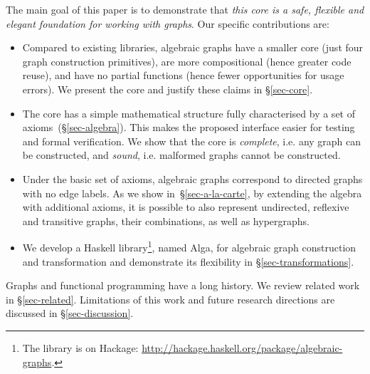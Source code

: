 The main goal of this paper is to demonstrate that \emph{this core is a safe, flexible
and elegant foundation for working with graphs}. Our specific contributions are:
\begin{itemize}
  \item Compared to existing libraries, algebraic graphs have a smaller
  core (just four graph construction primitives), are more compositional
  (hence greater code reuse), and have no partial functions (hence fewer
  opportunities for usage errors). We present the core and justify these claims
  in \S\ref{sec-core}.

  \item The core has a simple mathematical structure fully characterised
  by a set of axioms~(\S\ref{sec-algebra}). This makes the
  proposed interface easier for testing and formal verification. We show that
  the core is \emph{complete}, i.e. any graph can be constructed, and \emph{sound},
  i.e. malformed graphs cannot be constructed.

  \item Under the basic set of axioms, algebraic graphs correspond to directed
  graphs with no edge labels. As we show in~\S\ref{sec-a-la-carte}, by extending
  the algebra
  with additional axioms, it is possible to also represent undirected, reflexive
  and transitive graphs, their combinations, as well as hypergraphs.

  \item We develop a Haskell library\footnote{The library is on Hackage:
  \url{http://hackage.haskell.org/package/algebraic-graphs}.}, named \textsf{Alga},
  for algebraic graph construction and transformation and demonstrate its
  flexibility in \S\ref{sec-transformations}.
\end{itemize}

Graphs and functional programming have a long history. We review related
work in \S\ref{sec-related}. Limitations of this work and future
research directions are discussed in \S\ref{sec-discussion}.
